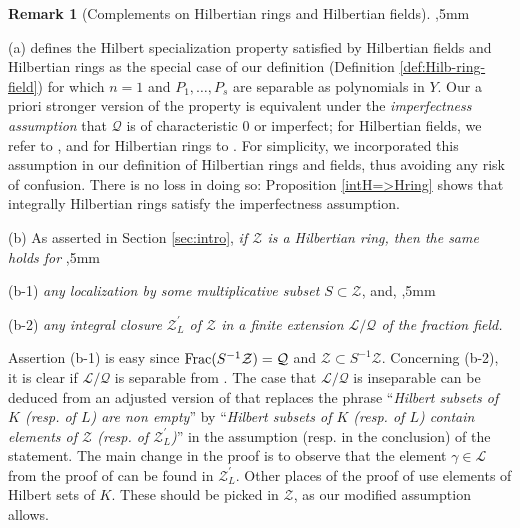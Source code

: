 \documentclass[11pt,a4paper,reqno]{amsart}
\theoremstyle{definition}
\newtheorem{rmk}[thm]{Remark}
\begin{document}
\begin{rmk}[Complements on Hilbertian rings and Hilbertian fields] \label{remiiredZvsQ} \hskip 1mm
,5mm


\noindent
(a) 
\cite[\S 13.1]{FJ23} defines the Hilbert specialization property satisfied by Hilbertian fields and Hilbertian rings as the special case of our definition (Definition \ref{def:Hilb-ring-field}) for which $n=1$ and $P_1,\ldots,P_s$ are separable as polynomials in $Y$. Our a priori stronger version of the property is equivalent under the \emph{imperfectness assumption} that ${\mathcal Q}$ is of characteristic $0$ or imperfect; for Hilbertian fields, we refer to \cite[Prop.13.4.3]{FJ23}, and for Hilbertian rings to \cite[Prop.4.2]{BDN20b}.
For simplicity, we incorporated this assumption in our definition of Hilbertian rings and fields, thus avoiding any risk of confusion. There is no loss in doing so: Proposition \ref{intH=>Hring} shows  that integrally Hilbertian rings satisfy the imperfectness assumption.
\vskip 1mm

\noindent
(b) As asserted in Section \ref{sec:intro}, \emph{if ${\mathcal Z}$ is a Hilbertian ring, then the same holds for}
,5mm

\noindent
(b-1) \emph{any localization by some multiplicative subset $S\subset {\mathcal Z}$}, and,
,5mm

\noindent
(b-2) \emph{any integral closure ${\mathcal Z}^\prime_L$ of ${\mathcal Z}$ in a finite extension ${\mathcal L}/{\mathcal Q}$ of the fraction field.} 
\vskip 1mm

\noindent
Assertion (b-1) is easy since ${\rm Frac}(S^{-1}{\mathcal Z})={\mathcal Q}$ and ${\mathcal Z}\subset S^{-1}{\mathcal Z}$. 
Concerning (b-2), it is  clear if ${\mathcal L}/{\mathcal Q}$ is separable from \cite[Cor.13.2.3]{FJ23}. The case that ${\mathcal L}/{\mathcal Q}$ is inseparable can be deduced from an adjusted version of \cite[Prop.13.3.6(b)]{FJ23} that replaces the phrase ``\emph{Hilbert subsets of $K$ (\hbox{\rm resp.} of $L$) are non empty}'' by ``\emph{Hilbert subsets of $K$ (\hbox{\rm resp.} of $L$) contain elements of ${\mathcal Z}$ (\hbox{\rm resp.} of ${\mathcal Z}^\prime_L$)}'' in the assumption (\hbox{resp.} in the conclusion) of the statement. The main change in the proof is to observe that the element $\gamma\in {\mathcal L}$ from the proof of \cite[Lemma 13.3.5]{FJ23} can be found in ${\mathcal Z}^\prime_L$. Other places of the proof of \cite[Prop.13.3.6(b)]{FJ23} use elements of Hilbert sets of $K$. These should be picked in ${\mathcal Z}$, as our modified assumption allows. 
\end{rmk}
\end{document}
